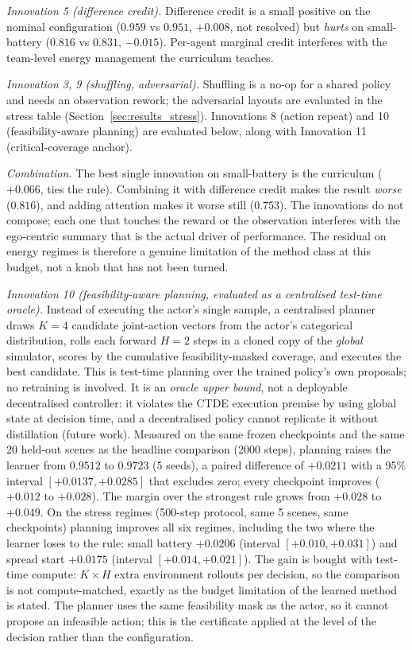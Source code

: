 \documentclass[conference]{IEEEtran}
\begin{document}
\emph{Innovation 5 (difference credit).}
Difference credit is a small positive on the nominal configuration
($0.959$ vs $0.951$, $+0.008$, not resolved) but \emph{hurts} on
small-battery ($0.816$ vs $0.831$, $-0.015$).  Per-agent marginal credit
interferes with the team-level energy management the curriculum teaches.

\emph{Innovation 3, 9 (shuffling, adversarial).}  Shuffling is a no-op
for a shared policy and needs an observation rework; the adversarial layouts
are evaluated in the stress table (Section~\ref{sec:results_stress}).
Innovations 8 (action repeat) and 10 (feasibility-aware planning) are
evaluated below, along with Innovation 11 (critical-coverage anchor).

\emph{Combination.}  The best single innovation on small-battery is the
curriculum ($+0.066$, ties the rule).  Combining it with difference credit
makes the result \emph{worse} ($0.816$), and adding attention makes it
worse still ($0.753$).  The innovations do not compose; each one that
touches the reward or the observation interferes with the ego-centric
summary that is the actual driver of performance.  The residual on energy
regimes is therefore a genuine limitation of the method class at this
budget, not a knob that has not been turned.

\emph{Innovation 10 (feasibility-aware planning, evaluated as a centralised
test-time oracle).}  Instead of executing the actor's single sample, a
centralised planner draws $K=4$ candidate joint-action vectors from the
actor's categorical distribution, rolls each forward $H=2$ steps in a
cloned copy of the \emph{global} simulator, scores by the cumulative
feasibility-masked coverage, and executes the best candidate.  This is
test-time planning over the trained policy's own proposals; no retraining
is involved.  It is an \emph{oracle upper bound}, not a deployable
decentralised controller: it violates the CTDE execution premise by
using global state at decision time, and a decentralised policy cannot
replicate it without distillation (future work).  Measured on the same
frozen checkpoints and the same 20 held-out scenes as the headline
comparison (2000 steps), planning raises the learner from $0.9512$ to
$0.9723$ (5 seeds), a paired difference of $+0.0211$ with a 95\% interval
$[+0.0137, +0.0285]$ that excludes zero; every checkpoint improves
($+0.012$ to $+0.028$).  The margin over the strongest rule grows from
$+0.028$ to $+0.049$.  On the stress regimes (500-step protocol, same
5 scenes, same checkpoints) planning improves all six regimes, including
the two where the learner loses to the rule: small battery $+0.0206$
(interval $[+0.010, +0.031]$) and spread start $+0.0175$ (interval
$[+0.014, +0.021]$).  The gain is bought with test-time compute: $K \times
H$ extra environment rollouts per decision, so the comparison is not
compute-matched, exactly as the budget limitation of the learned method is
stated.  The planner uses the same feasibility mask as the actor, so it
cannot propose an infeasible action; this is the certificate applied at the
level of the decision rather than the configuration.
\end{document}
